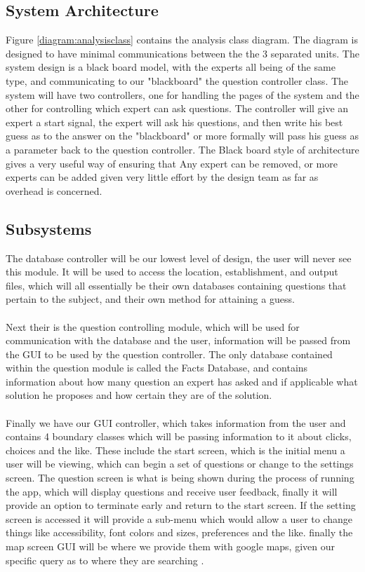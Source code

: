 \documentclass[titlepage]{article}
\begin{document}
\subsection{System Architecture}

Figure \ref{diagram:analysisclass} contains the analysis class diagram. The diagram is designed to have minimal communications between the the 3 separated units. The system design is a black board model, with the experts all being of the same type, and communicating to our "blackboard" the question controller class. The system will have two controllers, one for handling the pages of the system and the other for controlling which expert can ask questions. The controller will give an expert a start signal, the expert will ask his questions, and then write his best guess as to the answer on the "blackboard" or more formally will pass his guess as a parameter back to the question controller. The Black board style of architecture gives a very useful way of ensuring that Any expert can be removed, or more experts can be added given very little effort by the design team as far as overhead is concerned.


\subsection{Subsystems}
\label{sub:subsystems}
The database controller will be our lowest level of design, the user will never see this module. It will be used to access the location, establishment, and output files, which will all essentially be their own databases containing questions that pertain to the subject, and their own method for attaining a guess.\\ \\
Next their is the question controlling module, which will be used for communication with the database and the user, information will be passed from the GUI to be used by the question controller. The only database contained within the question module is called the Facts Database, and contains information about how many question an expert has asked and if applicable what solution he proposes and how certain they are of the solution. \\ \\
Finally we have our GUI controller, which takes information from the user and contains 4 boundary classes which will be passing information to it about clicks, choices and the like. These include the start screen, which is the initial menu a user will be viewing, which can begin a set of questions or change to the settings screen. The question screen is what is being shown during the process of running the app, which will display questions and receive user feedback, finally it will provide an option to terminate early and return to the start screen. If the setting screen is accessed it will provide a sub-menu which would allow a user to change things like accessibility, font colors and sizes, preferences and the like. finally the map screen GUI will be where we provide them with google maps, given our specific query as to where they are searching .
\end{document}
